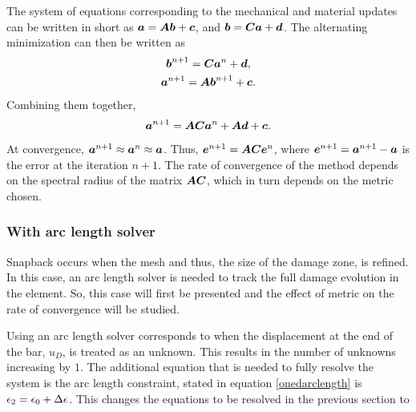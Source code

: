 \documentclass[10pt]{cas-sc}
\begin{document}
The system of equations corresponding to the mechanical and material updates can be written in short as $\mbox{\boldmath $a$} = \mbox{\boldmath $A$} \mbox{\boldmath $b$} + \mbox{\boldmath $c$}$, and $\mbox{\boldmath $b$} = \mbox{\boldmath $C$} \mbox{\boldmath $a$} + \mbox{\boldmath $d$}$. The alternating minimization can then be written as
\begin{gather*}
	\mbox{\boldmath $b$}^{n+1} = \mbox{\boldmath $C$} \mbox{\boldmath $a$}^{n} + \mbox{\boldmath $d$}, \\
	\mbox{\boldmath $a$}^{n+1} = \mbox{\boldmath $A$} \mbox{\boldmath $b$}^{n+1} + \mbox{\boldmath $c$}.
\end{gather*}
Combining them together, 
\begin{equation}
	\mbox{\boldmath $a$}^{n+1} = \mbox{\boldmath $A$} \mbox{\boldmath $C$}  \mbox{\boldmath $a$}^{n} +\mbox{\boldmath $A$} \mbox{\boldmath $d$} + \mbox{\boldmath $c$}. \label{combined_equn}
\end{equation}
At convergence, $\mbox{\boldmath $a$}^{n+1} \approx \mbox{\boldmath $a$}^{n} \approx \mbox{\boldmath $a$}$. Thus, $\mbox{\boldmath $e$}^{n+1} =  \mbox{\boldmath $A$} \mbox{\boldmath $C$} \mbox{\boldmath $e$}^{n}$, where $\mbox{\boldmath $e$}^{n+1} = \mbox{\boldmath $a$}^{n+1} - \mbox{\boldmath $a$}$ is the error at the iteration $n+1$. The rate of convergence of the method depends on the spectral radius of the matrix $\mbox{\boldmath $A$} \mbox{\boldmath $C$}$, which in turn depends on the metric chosen. 

\subsubsection*{With arc length solver}
Snapback occurs when the mesh and thus, the size of the damage zone, is refined. In this case, an arc length solver is needed to track the full damage evolution in the element. So, this case will first be presented and the effect of metric on the rate of convergence will be studied.

Using an arc length solver corresponds to when the displacement at the end of the bar, $u_D$, is treated as an unknown. This results in the number of unknowns increasing by $1$. The additional equation that is needed to fully resolve the system is the arc length constraint, stated in equation \ref{onedarclength} is ${\epsilon}_2 = {\epsilon}_0+ \Delta {\epsilon}$. This changes the equations to be resolved in the previous section to 
\end{document}
